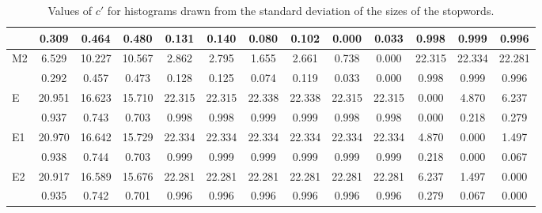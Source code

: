 \begin{table*}[h!]
\begin{center}
\begin{tabular}{| l | c | c | c | c | c | c | c | c | c | c | c | c |}
 & 0.309  & 0.464  & 0.480  & 0.131  & 0.140  & 0.080  & 0.102  & 0.000  & 0.033  & 0.998  & 0.999  & 0.996 \\\hline
M2 & 6.529  & 10.227  & 10.567  & 2.862  & 2.795  & 1.655  & 2.661  & 0.738  & 0.000  & 22.315  & 22.334  & 22.281 \\\hline
 & 0.292  & 0.457  & 0.473  & 0.128  & 0.125  & 0.074  & 0.119  & 0.033  & 0.000  & 0.998  & 0.999  & 0.996 \\\hline
E & 20.951  & 16.623  & 15.710  & 22.315  & 22.315  & 22.338  & 22.338  & 22.315  & 22.315  & 0.000  & 4.870  & 6.237 \\\hline
 & 0.937  & 0.743  & 0.703  & 0.998  & 0.998  & 0.999  & 0.999  & 0.998  & 0.998  & 0.000  & 0.218  & 0.279 \\\hline
E1 & 20.970  & 16.642  & 15.729  & 22.334  & 22.334  & 22.334  & 22.334  & 22.334  & 22.334  & 4.870  & 0.000  & 1.497 \\\hline
 & 0.938  & 0.744  & 0.703  & 0.999  & 0.999  & 0.999  & 0.999  & 0.999  & 0.999  & 0.218  & 0.000  & 0.067 \\\hline
E2 & 20.917  & 16.589  & 15.676  & 22.281  & 22.281  & 22.281  & 22.281  & 22.281  & 22.281  & 6.237  & 1.497  & 0.000 \\\hline
 & 0.935  & 0.742  & 0.701  & 0.996  & 0.996  & 0.996  & 0.996  & 0.996  & 0.996  & 0.279  & 0.067  & 0.000 \\\hline
\end{tabular}
\caption{Values of $c'$ for histograms drawn from the standard deviation of the sizes of the stopwords.}
\end{center}
\end{table*}